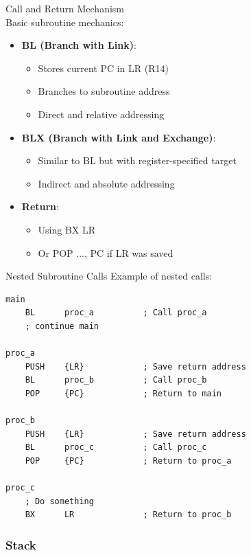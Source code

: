 \begin{concept}{Call and Return Mechanism}\\
Basic subroutine mechanics:
\begin{itemize}
  \item \textbf{BL (Branch with Link)}:
    \begin{itemize}
      \item Stores current PC in LR (R14)
      \item Branches to subroutine address
      \item Direct and relative addressing
    \end{itemize}
  \item \textbf{BLX (Branch with Link and Exchange)}:
    \begin{itemize}
      \item Similar to BL but with register-specified target
      \item Indirect and absolute addressing
    \end{itemize}
  \item \textbf{Return}:
    \begin{itemize}
      \item Using BX LR
      \item Or POP {..., PC} if LR was saved
    \end{itemize}
\end{itemize}
\end{concept}

\begin{example2}{Nested Subroutine Calls}
Example of nested calls:
\begin{lstlisting}[language=armasm, style=basesmol]
main
    BL      proc_a          ; Call proc_a
    ; continue main
    
proc_a
    PUSH    {LR}            ; Save return address
    BL      proc_b          ; Call proc_b
    POP     {PC}            ; Return to main
    
proc_b
    PUSH    {LR}            ; Save return address
    BL      proc_c          ; Call proc_c
    POP     {PC}            ; Return to proc_a
    
proc_c
    ; Do something
    BX      LR              ; Return to proc_b
\end{lstlisting}
\end{example2}

\subsubsection{Stack}

